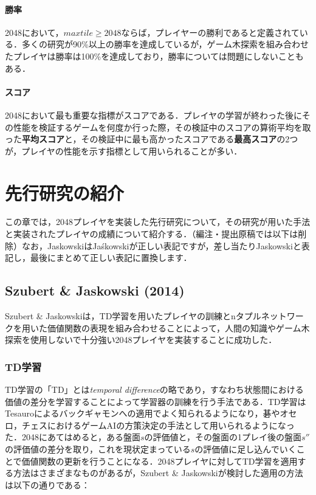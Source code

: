 \documentclass{suribt}
\begin{document}
\subsubsection{勝率}
2048において，$max tile \geq 2048$ならば，プレイヤーの勝利であると定義されている．多くの研究が90\%以上の勝率を達成しているが，ゲーム木探索を組み合わせたプレイヤは勝率は100\%を達成しており，勝率については問題にしないこともある．

\subsubsection{スコア}
2048において最も重要な指標がスコアである．プレイヤの学習が終わった後にその性能を検証するゲームを何度か行った際，その検証中のスコアの算術平均を取った\textbf{平均スコア}と，その検証中に最も高かったスコアである\textbf{最高スコア}の2つが，プレイヤの性能を示す指標として用いられることが多い．

\chapter{先行研究の紹介}
この章では，2048プレイヤを実装した先行研究について，その研究が用いた手法と実装されたプレイヤの成績について紹介する．（編注・提出原稿では以下は削除）なお，JaskowskiはJa\'{s}kowskiが正しい表記ですが，差し当たりJaskowskiと表記し，最後にまとめて正しい表記に置換します．

\section{Szubert \& Jaskowski (2014)}
Szubert \& Jaskowskiは，TD学習を用いたプレイヤの訓練とnタプルネットワークを用いた価値関数の表現を組み合わせることによって，人間の知識やゲーム木探索を使用しないで十分強い2048プレイヤを実装することに成功した．
\subsection{TD学習}
TD学習の「TD」とは\emph{temporal difference}の略であり，すなわち状態間における価値の差分を学習することによって学習器の訓練を行う手法である．TD学習はTesauroによるバックギャモンへの適用\cite{Tesauro}でよく知られるようになり，碁\cite{Runarsson}\cite{Schraudolph}やオセロ\cite{Dries}\cite{SzubertOthello}，チェス\cite{Baxter}におけるゲームAIの方策決定の手法として用いられるようになった．2048にあてはめると，ある盤面$s$の評価値と，その盤面の1プレイ後の盤面$s''$の評価値の差分を取り，これを現状定まっている$s$の評価値に足し込んでいくことで価値関数の更新を行うことになる．2048プレイヤに対してTD学習を適用する方法はさまざまなものがあるが，Szubert \& Jaskowskiが検討した適用の方法は以下の通りである：
\end{document}
